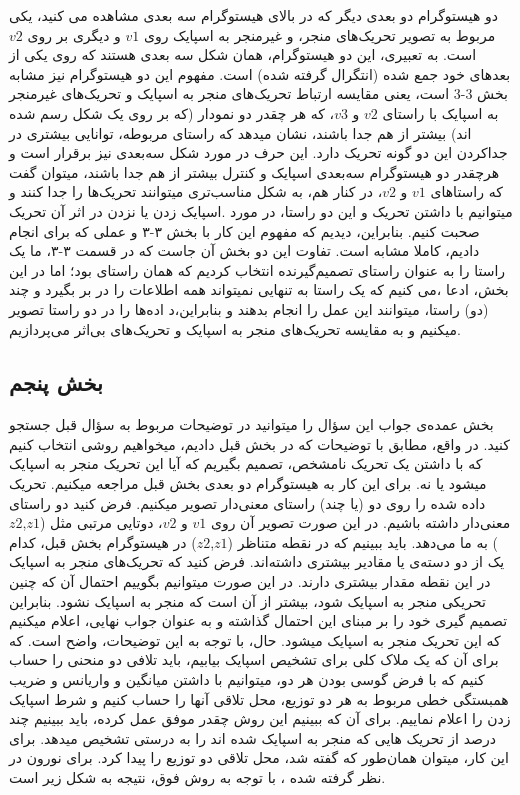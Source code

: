 \documentclass[12pt,onecolumn,a4paper,fleqn]{article}
\begin{document}
دو هیستوگرام دو بعدی دیگر که در بالای هیستوگرام سه بعدی مشاهده می کنید، یکی مربوط به تصویر تحریک‌های منجر، و غیرمنجر به اسپایک روی $ v1 $ و دیگری بر روی $ v2 $‌ است. به تعبیری، این دو هیستوگرام، همان شکل سه بعدی هستند که روی یکی از بعدهای خود جمع شده (انتگرال گرفته شده) است. مفهوم این دو هیستوگرام نیز مشابه بخش 3-3 است، یعنی مقایسه ارتباط تحریک‌های منجر به اسپایک و تحریک‌های غیرمنجر به اسپایک با راستای $ v2 $ و $ v3 $، که هر چقدر دو نمودار (که بر روی یک شکل رسم شده اند) بیشتر از هم جدا باشند، نشان میدهد که راستای مربوطه، توانایی بیشتری در جداکردن این دو گونه تحریک دارد. این حرف در مورد شکل سه‌بعدی نیز برقرار است و هرچقدر دو هیستوگرام سه‌بعدی اسپایک و کنترل بیشتر از هم جدا باشند، میتوان گفت که راستاهای $ v1 $ و $ v2 $، در کنار هم، به شکل مناسب‌تری میتوانند تحریک‌ها را جدا کنند و میتوانیم با داشتن تحریک و این دو راستا، در مورد .اسپایک زدن یا نزدن در اثر آن تحریک صحبت کنیم.
بنابراین، دیدیم که مفهوم این کار با بخش ۳-۳ و عملی که برای  انجام دادیم، کاملا مشابه است. تفاوت این دو بخش آن جاست که در قسمت ۳-۳، ما یک راستا را به عنوان راستای تصمیم‌گیرنده انتخاب کردیم که همان راستای  بود؛ اما در این بخش، ادعا ،می کنیم که یک راستا به تنهایی نمیتواند همه اطلاعات را در بر بگیرد و چند (دو) راستا، میتوانند این عمل را انجام بدهند و بنابراین،د اده‌ها را در دو راستا تصویر میکنیم و به مقایسه تحریک‌های منجر به اسپایک و تحریک‌های بی‌ا‌ثر می‌پردازیم. 

\subsection{بخش پنجم}

بخش عمده‌ی جواب این سؤال را میتوانید در توضیحات مربوط به سؤال قبل جستجو کنید. در واقع، مطابق با توضیحات که در بخش قبل دادیم، میخواهیم روشی انتخاب کنیم که با داشتن یک تحریک نامشخص، تصمیم بگیریم که آیا این تحریک منجر به اسپایک میشود یا نه. برای این کار به هیستوگرام دو بعدی بخش قبل مراجعه میکنیم. تحریک داده شده را روی دو (یا چند) راستای معنی‌دار تصویر میکنیم. فرض کنید دو راستای معنی‌دار داشته باشیم. در این صورت تصویر آن روی $ v1 $ و $ v2 $، دوتایی مرتبی مثل ($ z1 $,$ z2 $) به ما می‌دهد. باید ببینیم که در نقطه متناظر ($ z1 $,$ z2 $) در هیستوگرام بخش قبل، کدام یک از دو دسته‌ی  یا  مقادیر بیشتری داشته‌اند. فرض کنید که تحریک‌های منجر به اسپایک در این نقطه مقدار بیشتری دارند. در این صورت میتوانیم بگوییم احتمال آن که چنین تحریکی منجر به اسپایک شود، بیشتر از آن است که منجر به اسپایک نشود. بنابراین تصمیم گیری خود را بر مبنای این احتمال گذاشته و به عنوان جواب نهایی، اعلام میکنیم که این تحریک منجر به اسپایک میشود. حال، با توجه به این توضیحات، واضح است. که برای آن که یک ملاک کلی برای تشخیص اسپایک بیابیم، باید تلافی دو منحنی را حساب کنیم که با فرض گوسی بودن هر دو، میتوانیم با داشتن میانگین و واریانس و ضریب همبستگی خطی مربوط به هر دو توزیع، محل تلاقی آنها را حساب کنیم و شرط اسپایک زدن را اعلام نماییم.
برای آن که ببینیم این روش چقدر موفق عمل کرده، باید ببینیم چند درصد از تحریک هایی که منجر به اسپایک شده اند را به درستی تشخیص میدهد. برای این کار، میتوان همان‌‌طور که گفته شد، محل تلاقی دو توزیع را پیدا کرد.
برای نورون در نظر گرفته شده ، با توجه به روش فوق، نتیجه به شکل زیر است.
\end{document}
